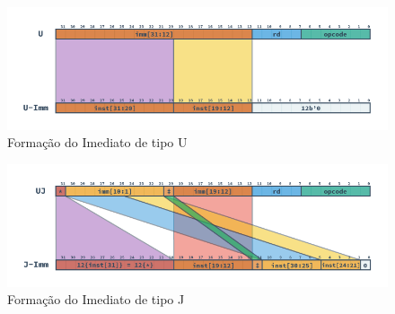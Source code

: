 \begin{figure}[H]
\centering
    \includegraphics[width=1\linewidth]{images/RV_U_Imm.png}
    \caption{Formação do Imediato de tipo U
        }\label{fig:riscv_u_imm}
\end{figure}

\begin{figure}[H]
\centering
    \includegraphics[width=1\linewidth]{images/RV_J_Imm.png}
    \caption{Formação do Imediato de tipo J
        }\label{fig:riscv_j_imm}
\end{figure}



